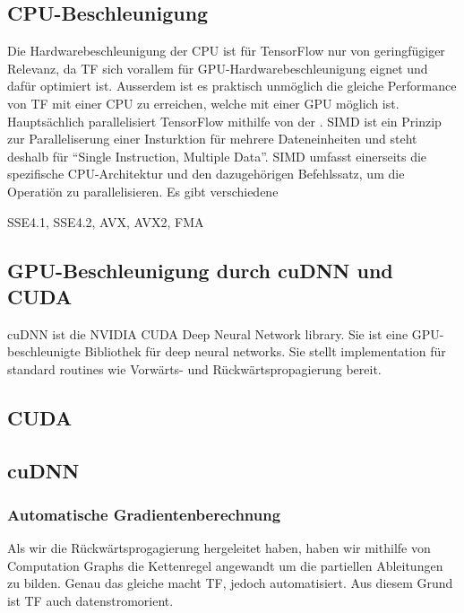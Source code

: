 \begin{appendices}
\subsection*{CPU-Beschleunigung}
Die Hardwarebeschleunigung der CPU ist für TensorFlow nur von geringfügiger
Relevanz, da TF sich vorallem für GPU-Hardwarebeschleunigung eignet
und dafür optimiert ist. Ausserdem ist es praktisch unmöglich die gleiche
Performance von TF mit einer CPU zu erreichen, welche mit einer GPU möglich ist.
\para{}
Hauptsächlich parallelisiert TensorFlow mithilfe von der . SIMD
ist ein Prinzip zur Paralleliserung einer Insturktion für mehrere
Dateneinheiten und steht deshalb für ``Single Instruction, Multiple Data''.
SIMD umfasst einerseits die spezifische CPU-Architektur und den dazugehörigen
Befehlssatz, um die Operatiön zu parallelisieren.
Es gibt verschiedene

SSE4.1, SSE4.2, AVX, AVX2, FMA

\subsection*{GPU-Beschleunigung durch cuDNN und CUDA}
cuDNN ist die NVIDIA CUDA Deep Neural Network library. Sie ist eine
GPU-beschleunigte Bibliothek für deep neural networks. Sie stellt
implementation für standard routines wie Vorwärts- und Rückwärtspropagierung bereit.

\subsection*{CUDA}
\subsection*{cuDNN}


\subsubsection*{Automatische Gradientenberechnung}
Als wir die Rückwärtsprogagierung hergeleitet haben, haben wir mithilfe von
Computation Graphs die Kettenregel angewandt um die partiellen Ableitungen zu
bilden. Genau das gleiche macht TF, jedoch automatisiert. Aus diesem Grund ist
TF auch datenstromorient.




\end{appendices}
